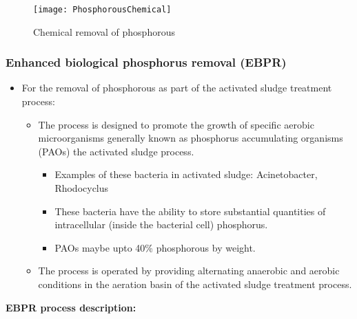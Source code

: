 			\begin{figure}[h]	
				\begin{center}
					\texttt{[image: PhosphorousChemical]}
					\caption{Chemical removal of phosphorous}
				\end{center}
					\end{figure}
\subsubsection{Enhanced biological phosphorus removal (EBPR)}
				\begin{itemize}
					\item For the removal of phosphorous as part of the activated sludge treatment process:\\
					\begin{itemize}
					\item The process is designed to promote the growth of specific aerobic microorganisms generally known as phosphorus accumulating organisms (PAOs) the activated sludge process.  
					\begin{itemize}
					\item Examples of these bacteria in activated sludge: Acinetobacter, Rhodocyclus
					\item These bacteria have the ability to store substantial quantities of intracellular (inside the bacterial cell) phosphorus.
					\item PAOs maybe upto 40\% phosphorous by weight.
					\end{itemize}
					
					\item The process is operated by providing alternating anaerobic and aerobic conditions in the aeration basin of the activated sludge treatment process.
				\end{itemize}
				\end{itemize}
			\textbf{EBPR process description:}
